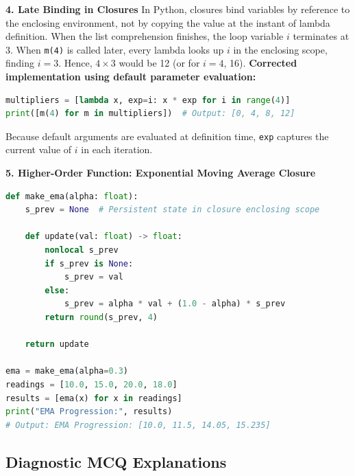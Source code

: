 \textbf{4. Late Binding in Closures}
In Python, closures bind variables by reference to the enclosing environment, not by copying the value at the instant of lambda definition. When the list comprehension finishes, the loop variable $i$ terminates at $3$. When \texttt{m(4)} is called later, every lambda looks up $i$ in the enclosing scope, finding $i = 3$. Hence, $4 \times 3$ would be 12 (or for $i=4$, 16).
\textbf{Corrected implementation using default parameter evaluation:}
\begin{lstlisting}[language=Python]
multipliers = [lambda x, exp=i: x * exp for i in range(4)]
print([m(4) for m in multipliers])  # Output: [0, 4, 8, 12]
\end{lstlisting}
Because default arguments are evaluated at definition time, \texttt{exp} captures the current value of $i$ in each iteration.

\textbf{5. Higher-Order Function: Exponential Moving Average Closure}
\begin{lstlisting}[language=Python]
def make_ema(alpha: float):
    s_prev = None  # Persistent state in closure enclosing scope

    def update(val: float) -> float:
        nonlocal s_prev
        if s_prev is None:
            s_prev = val
        else:
            s_prev = alpha * val + (1.0 - alpha) * s_prev
        return round(s_prev, 4)

    return update

ema = make_ema(alpha=0.3)
readings = [10.0, 15.0, 20.0, 18.0]
results = [ema(x) for x in readings]
print("EMA Progression:", results)
# Output: EMA Progression: [10.0, 11.5, 14.05, 15.235]
\end{lstlisting}

\subsection*{Diagnostic MCQ Explanations}

